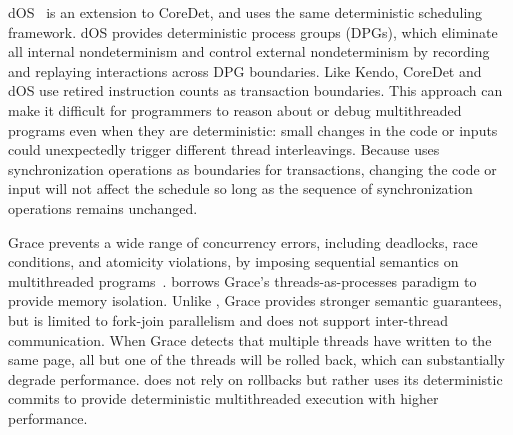 dOS~\cite{deterministic-process-groups} is an extension to CoreDet,
and uses the same deterministic scheduling framework.  dOS provides
deterministic process groups (DPGs), which eliminate all internal
nondeterminism and control external nondeterminism by recording and
replaying interactions across DPG boundaries.  Like Kendo, CoreDet and
dOS use retired instruction counts as transaction boundaries.  This
approach can make it difficult for programmers to reason about or
debug multithreaded programs even when they are deterministic: small
changes in the code or inputs could unexpectedly trigger different
thread interleavings. Because \dthreads{} uses synchronization
operations as boundaries for transactions, changing the code or input
will not affect the schedule so long as the sequence of
synchronization operations remains unchanged.

Grace prevents a wide range of concurrency errors, including
deadlocks, race conditions, and atomicity violations, by imposing
sequential semantics on multithreaded
programs~\cite{grace}.  \dthreads{} borrows Grace's
threads-as-processes paradigm to provide memory isolation.
Unlike \dthreads{}, Grace provides stronger semantic guarantees, but is
limited to fork-join parallelism and does not support inter-thread
communication.  When Grace detects that multiple threads have written
to the same page, all but one of the threads will be rolled back,
which can substantially degrade performance.  \dthreads{} does not
rely on rollbacks but rather uses its deterministic commits to provide
deterministic multithreaded execution with higher performance.






